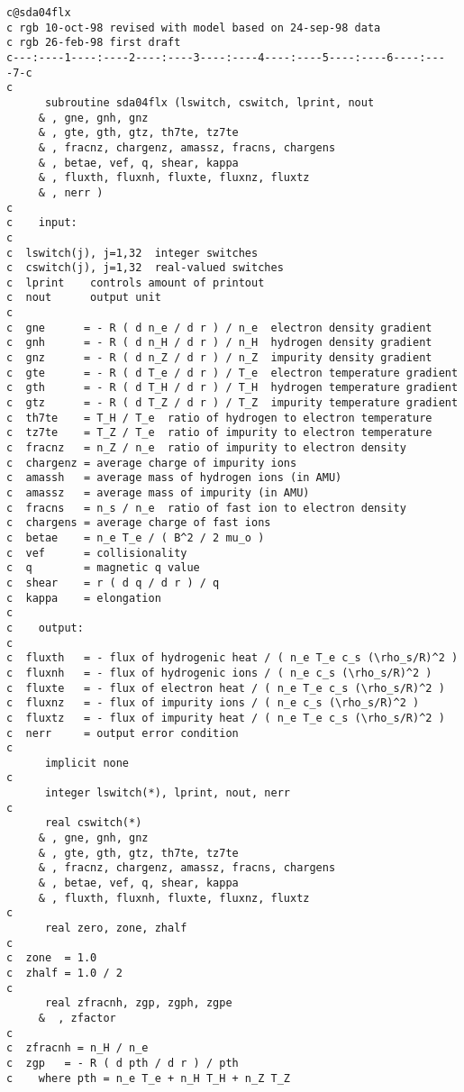 \begin{verbatim}
c@sda04flx
c rgb 10-oct-98 revised with model based on 24-sep-98 data
c rgb 26-feb-98 first draft
c---:----1----:----2----:----3----:----4----:----5----:----6----:----7-c
c
      subroutine sda04flx (lswitch, cswitch, lprint, nout
     & , gne, gnh, gnz
     & , gte, gth, gtz, th7te, tz7te
     & , fracnz, chargenz, amassz, fracns, chargens
     & , betae, vef, q, shear, kappa
     & , fluxth, fluxnh, fluxte, fluxnz, fluxtz
     & , nerr )
c
c    input:
c
c  lswitch(j), j=1,32  integer switches
c  cswitch(j), j=1,32  real-valued switches
c  lprint    controls amount of printout
c  nout      output unit
c
c  gne      = - R ( d n_e / d r ) / n_e  electron density gradient
c  gnh      = - R ( d n_H / d r ) / n_H  hydrogen density gradient
c  gnz      = - R ( d n_Z / d r ) / n_Z  impurity density gradient
c  gte      = - R ( d T_e / d r ) / T_e  electron temperature gradient
c  gth      = - R ( d T_H / d r ) / T_H  hydrogen temperature gradient
c  gtz      = - R ( d T_Z / d r ) / T_Z  impurity temperature gradient
c  th7te    = T_H / T_e  ratio of hydrogen to electron temperature
c  tz7te    = T_Z / T_e  ratio of impurity to electron temperature
c  fracnz   = n_Z / n_e  ratio of impurity to electron density
c  chargenz = average charge of impurity ions
c  amassh   = average mass of hydrogen ions (in AMU)
c  amassz   = average mass of impurity (in AMU)
c  fracns   = n_s / n_e  ratio of fast ion to electron density
c  chargens = average charge of fast ions
c  betae    = n_e T_e / ( B^2 / 2 mu_o )
c  vef      = collisionality
c  q        = magnetic q value
c  shear    = r ( d q / d r ) / q
c  kappa    = elongation
c
c    output:
c
c  fluxth   = - flux of hydrogenic heat / ( n_e T_e c_s (\rho_s/R)^2 )
c  fluxnh   = - flux of hydrogenic ions / ( n_e c_s (\rho_s/R)^2 )
c  fluxte   = - flux of electron heat / ( n_e T_e c_s (\rho_s/R)^2 )
c  fluxnz   = - flux of impurity ions / ( n_e c_s (\rho_s/R)^2 )
c  fluxtz   = - flux of impurity heat / ( n_e T_e c_s (\rho_s/R)^2 )
c  nerr     = output error condition
c
      implicit none
c
      integer lswitch(*), lprint, nout, nerr
c
      real cswitch(*) 
     & , gne, gnh, gnz
     & , gte, gth, gtz, th7te, tz7te
     & , fracnz, chargenz, amassz, fracns, chargens
     & , betae, vef, q, shear, kappa
     & , fluxth, fluxnh, fluxte, fluxnz, fluxtz
c
      real zero, zone, zhalf
c
c  zone  = 1.0
c  zhalf = 1.0 / 2
c
      real zfracnh, zgp, zgph, zgpe
     &  , zfactor
c
c  zfracnh = n_H / n_e
c  zgp   = - R ( d pth / d r ) / pth
c    where pth = n_e T_e + n_H T_H + n_Z T_Z

\end{verbatim}
